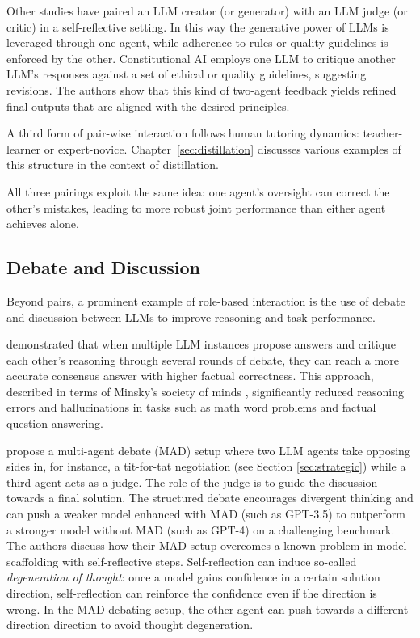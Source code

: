 Other studies have paired an LLM creator (or generator) with an LLM judge (or critic) in a self-reflective setting. In this way the generative power of LLMs is leveraged through one agent, while adherence to rules or quality guidelines is enforced by the other. Constitutional AI \citep{bai2022constitutional} employs one LLM to critique another LLM’s responses against a set of ethical or quality guidelines, suggesting revisions. The authors show that this kind of two-agent feedback yields refined final outputs that are aligned with the desired principles.

A third form of pair-wise interaction follows human tutoring dynamics: teacher-learner or expert-novice. Chapter~\ref{sec:distillation} discusses various examples of this structure in the context of distillation.

All three pairings exploit the same idea: one agent's oversight can correct the other's mistakes, leading to more robust joint performance than either agent achieves alone.

\subsection{Debate and Discussion}
Beyond pairs, a prominent example of role-based interaction is the use of debate and discussion between LLMs to improve reasoning and task performance.

\citet{du2024debate} demonstrated that when multiple LLM instances propose answers and critique each other’s reasoning through several rounds of debate, they can reach a more accurate consensus answer with higher factual correctness. This approach, described in terms of Minsky's society of minds \citep{minsky1988society}, significantly reduced reasoning errors and hallucinations in tasks such as math word problems and factual question answering.

\citet{liang-etal-2024-encouraging} propose a multi-agent debate (MAD) setup where two LLM agents take opposing sides in, for instance, a tit-for-tat negotiation (see Section \ref{sec:strategic}) while a third agent acts as a judge. The role of the judge is to guide the discussion towards a final solution. The structured debate encourages divergent thinking and can push a weaker model enhanced with MAD (such as GPT-3.5) to outperform a stronger model without MAD (such as GPT-4) on a challenging benchmark. The authors discuss how their MAD setup overcomes a known problem in model scaffolding with self-reflective steps. Self-reflection can induce so-called \emph{degeneration of thought}: once a model gains confidence in a certain solution direction, self-reflection can reinforce the confidence even if the direction is wrong. In the MAD debating-setup, the other agent can push towards a different direction direction to avoid thought degeneration.

